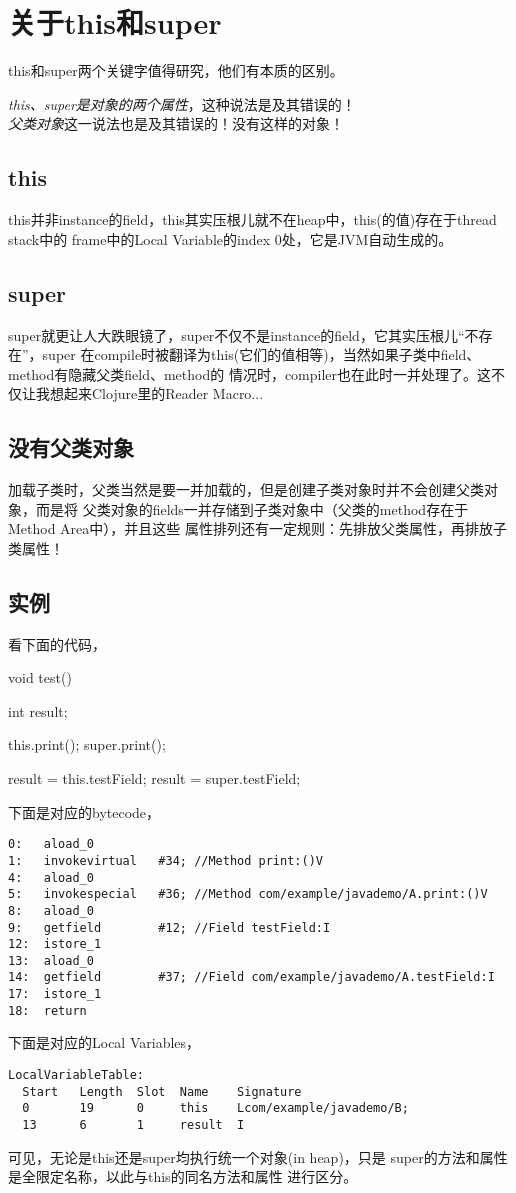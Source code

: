 \section[关于this和super]{关于this和super}
this和super两个关键字值得研究，他们有本质的区别。

\emph{this、super是对象的两个属性}，这种说法是及其错误的！\\
\emph{父类对象}这一说法也是及其错误的！没有这样的对象！

\subsection[this]{this}
this并非instance的field，this其实压根儿就不在heap中，this(的值)存在于thread stack中的
frame中的Local Variable的index 0处，它是JVM自动生成的。

\subsection[super]{super}
super就更让人大跌眼镜了，super不仅不是instance的field，它其实压根儿“不存在”，super
在compile时被翻译为this(它们的值相等)，当然如果子类中field、method有隐藏父类field、method的
情况时，compiler也在此时一并处理了。这不仅让我想起来Clojure里的Reader Macro...

\subsection[没有父类对象]{没有父类对象}
加载子类时，父类当然是要一并加载的，但是创建子类对象时并不会创建父类对象，而是将
父类对象的fields一并存储到子类对象中（父类的method存在于Method Area中），并且这些
属性排列还有一定规则：先排放父类属性，再排放子类属性！

\subsection[Example]{实例}
看下面的代码，

\begin{javacode}
void test() {
  int result;

  this.print();
  super.print();

  result = this.testField;
  result = super.testField;
}
\end{javacode}

下面是对应的bytecode，
\begin{verbatim}
0:   aload_0
1:   invokevirtual   #34; //Method print:()V
4:   aload_0
5:   invokespecial   #36; //Method com/example/javademo/A.print:()V
8:   aload_0
9:   getfield        #12; //Field testField:I
12:  istore_1
13:  aload_0
14:  getfield        #37; //Field com/example/javademo/A.testField:I
17:  istore_1
18:  return
\end{verbatim}

下面是对应的Local Variables，
\begin{verbatim}
LocalVariableTable:
  Start   Length  Slot  Name    Signature
  0       19      0     this    Lcom/example/javademo/B;
  13      6       1     result  I
\end{verbatim}

可见，无论是this还是super均执行统一个对象(in heap)，只是
super的方法和属性是全限定名称，以此与this的同名方法和属性
进行区分。